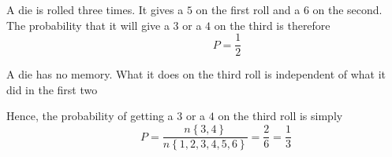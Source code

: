 \documentclass[14pt,fleqn]{extarticle}
\begin{document}
 
\begin{snippet}
    
    \incorrect
    
    A die is rolled three times. It gives a $5$ on the first roll and a $6$ on the second. The probability that it will give a $3$ or a $4$ on the third is therefore 
    \[ \qquad\qquad P = \frac{1}{2} \]
    
    \reason
    
    A die has no memory. What it does on the third roll is independent of what it did in the first two\newline 
    
    Hence, the probability of getting a $3$ or a $4$ on the third roll is simply 
    \[ \qquad P = \dfrac{n\left\lbrace 3,4\right\rbrace}{n\left\lbrace 1,2,3,4,5,6\right\rbrace} = \dfrac{2}{6} = \frac{1}{3} \]
    
\end{snippet} 
\end{document}
